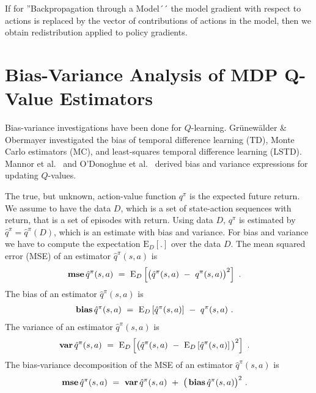 \documentclass{article}
\newcommand\EXP{\mathbf{\mathrm{E}}}
\newcommand{\mse}{\mathop{\bf mse}}
\newcommand{\bias}{\mathop{\bf bias}}
\newcommand{\var}{\mathop{\bf var}}
\begin{document}
\begin{appendices}
If for ''Backpropagation through a Model´´ 
the model gradient with respect to actions
is replaced by the vector of contributions of actions in the model, 
then we obtain 
redistribution applied to policy gradients.

\section{Bias-Variance Analysis of MDP Q-Value Estimators}
\label{sec:AbiasVariance}

Bias-variance investigations have been done for $Q$-learning.
Gr{\"{u}}new{\"{a}}lder \& Obermayer \cite{Grunewalder:11}
investigated the bias of temporal
difference learning (TD), Monte Carlo estimators (MC), and least-squares temporal
difference learning (LSTD).
Mannor et al.\ \cite{Mannor:07} and O'Donoghue et al.\ \cite{ODonoghue:17}
derived bias and variance expressions for updating
$Q$-values.

The true, but unknown, action-value function $q^\pi$
is the expected future return.
We assume to have the data $D$,
which is a set of state-action sequences with return,
that is a set of episodes with return.
Using data $D$, $q^\pi$ is 
estimated by $\hat{q}^\pi = \hat{q}^\pi (D)$, which
is an estimate with bias and variance.
For bias and variance we have to compute
the expectation $\EXP_D \left[ . \right]$ over the data $D$.
The mean squared error (MSE) of an estimator $\hat{q}^\pi(s,a)$ is
\begin{align}
\label{eq:mse}
  \mse \hat{q}^\pi(s,a) \ &= \ \EXP_D \left[ \big( \hat{q}^\pi(s,a)\ - \ q^\pi(s,a) \big)^2  \right] \ .
\end{align}
The bias of an estimator $\hat{q}^\pi(s,a)$ is
\begin{align}
\label{eq:bias}
  \bias \hat{q}^\pi(s,a) \ &= \ \EXP_D \left[ \hat{q}^\pi(s,a) \right] \ - \ q^\pi(s,a) \ .
\end{align}
The variance of an estimator $\hat{q}^\pi(s,a)$ is
\begin{align}
\label{eq:var}
 \var \hat{q}^\pi(s,a) \ &= \ \EXP_D \left[ \big( \hat{q}^\pi(s,a) \ - \
  \EXP_D \left[\hat{q}^\pi(s,a) \right] \big)^2  \right] \ .
\end{align}
The bias-variance decomposition of the MSE of an estimator $\hat{q}^\pi(s,a)$ is
\begin{align}
\label{eq:mseDecomp}
 \mse \hat{q}^\pi(s,a) \ &= \ \var \hat{q}^\pi(s,a) \ + \  \big( \bias \hat{q}^\pi(s,a)
 \big)^2 \ .
\end{align}


\end{appendices}
\end{document}
